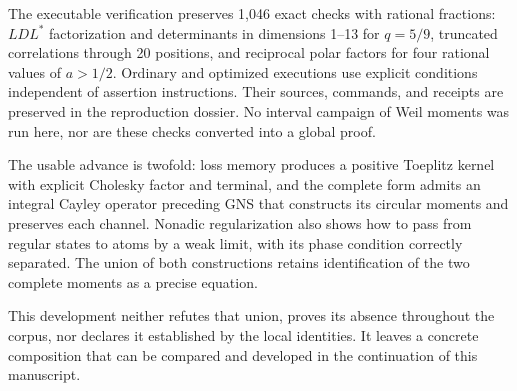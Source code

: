 % 
The executable verification preserves 1,046 exact checks with rational fractions: \(LDL^*\) factorization and determinants in dimensions 1–13 for \(q=5/9\), truncated correlations through 20 positions, and reciprocal polar factors for four rational values of \(a>1/2\). Ordinary and optimized executions use explicit conditions independent of assertion instructions. Their sources, commands, and receipts are preserved in the reproduction dossier. No interval campaign of Weil moments was run here, nor are these checks converted into a global proof.

The usable advance is twofold: loss memory produces a positive Toeplitz kernel with explicit Cholesky factor and terminal, and the complete form admits an integral Cayley operator preceding GNS that constructs its circular moments and preserves each channel. Nonadic regularization also shows how to pass from regular states to atoms by a weak limit, with its phase condition correctly separated. The union of both constructions retains identification of the two complete moments as a precise equation.

This development neither refutes that union, proves its absence throughout the corpus, nor declares it established by the local identities. It leaves a concrete composition that can be compared and developed in the continuation of this manuscript.

